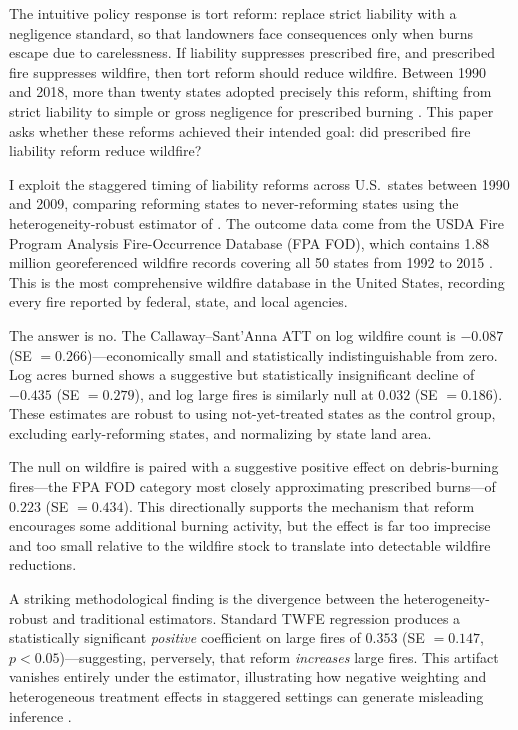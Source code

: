 \documentclass[12pt]{article}
\begin{document}
The intuitive policy response is tort reform: replace strict liability with a negligence standard, so that landowners face consequences only when burns escape due to carelessness. If liability suppresses prescribed fire, and prescribed fire suppresses wildfire, then tort reform should reduce wildfire. Between 1990 and 2018, more than twenty states adopted precisely this reform, shifting from strict liability to simple or gross negligence for prescribed burning \citep{Yoder2008, Sun2006}. This paper asks whether these reforms achieved their intended goal: did prescribed fire liability reform reduce wildfire?

I exploit the staggered timing of liability reforms across U.S.\ states between 1990 and 2009, comparing reforming states to never-reforming states using the heterogeneity-robust estimator of \citet{CallawayS2021}. The outcome data come from the USDA Fire Program Analysis Fire-Occurrence Database (FPA FOD), which contains 1.88 million georeferenced wildfire records covering all 50 states from 1992 to 2015 \citep{Short2017}. This is the most comprehensive wildfire database in the United States, recording every fire reported by federal, state, and local agencies.

The answer is no. The Callaway--Sant'Anna ATT on log wildfire count is $-0.087$ (SE $= 0.266$)---economically small and statistically indistinguishable from zero. Log acres burned shows a suggestive but statistically insignificant decline of $-0.435$ (SE $= 0.279$), and log large fires is similarly null at $0.032$ (SE $= 0.186$). These estimates are robust to using not-yet-treated states as the control group, excluding early-reforming states, and normalizing by state land area.

The null on wildfire is paired with a suggestive positive effect on debris-burning fires---the FPA FOD category most closely approximating prescribed burns---of $0.223$ (SE $= 0.434$). This directionally supports the mechanism that reform encourages some additional burning activity, but the effect is far too imprecise and too small relative to the wildfire stock to translate into detectable wildfire reductions.

A striking methodological finding is the divergence between the heterogeneity-robust and traditional estimators. Standard TWFE regression produces a statistically significant \textit{positive} coefficient on large fires of $0.353$ (SE $= 0.147$, $p < 0.05$)---suggesting, perversely, that reform \textit{increases} large fires. This artifact vanishes entirely under the \citet{CallawayS2021} estimator, illustrating how negative weighting and heterogeneous treatment effects in staggered settings can generate misleading inference \citep{GoodmanBacon2021, deChaisemartinH2020}.
\end{document}
